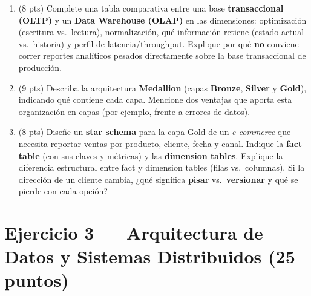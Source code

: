 \documentclass[11pt,a4paper]{article}
\begin{document}
\begin{enumerate}
  \item (8 pts) Complete una tabla comparativa entre una base \textbf{transaccional (OLTP)} y un \textbf{Data Warehouse (OLAP)} en las dimensiones: optimización (escritura vs.\ lectura), normalización, qué información retiene (estado actual vs.\ historia) y perfil de latencia/throughput. Explique por qué \textbf{no} conviene correr reportes analíticos pesados directamente sobre la base transaccional de producción.

  \vspace{5.5cm}

  \item (9 pts) Describa la arquitectura \textbf{Medallion} (capas \textbf{Bronze}, \textbf{Silver} y \textbf{Gold}), indicando qué contiene cada capa. Mencione dos ventajas que aporta esta organización en capas (por ejemplo, frente a errores de datos).

  \vspace{5.5cm}

  \item (8 pts) Diseñe un \textbf{star schema} para la capa Gold de un \textit{e-commerce} que necesita reportar ventas por producto, cliente, fecha y canal. Indique la \textbf{fact table} (con sus claves y métricas) y las \textbf{dimension tables}. Explique la diferencia estructural entre fact y dimension tables (filas vs.\ columnas). Si la dirección de un cliente cambia, ¿qué significa \textbf{pisar} vs.\ \textbf{versionar} y qué se pierde con cada opción?

  \vspace{6cm}
\end{enumerate}

\newpage

\section*{Ejercicio 3 — Arquitectura de Datos y Sistemas Distribuidos \hfill\normalfont(25 puntos)}
\end{document}
